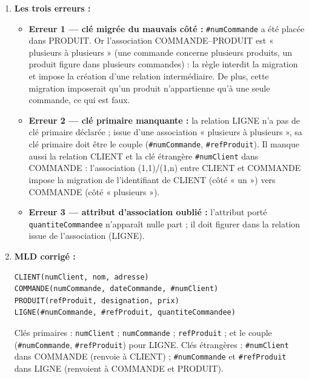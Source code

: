 \documentclass[11pt]{article}
\begin{document}
\begin{corrige}
\begin{enumerate}
  \item \textbf{Les trois erreurs :}
  \begin{itemize}
    \item \textbf{Erreur 1 — clé migrée du mauvais côté :} \texttt{\#numCommande} a été placée dans PRODUIT. Or l'association COMMANDE--PRODUIT est « plusieurs à plusieurs » (une commande concerne plusieurs produits, un produit figure dans plusieurs commandes) : la règle interdit la migration et impose la création d'une relation intermédiaire. De plus, cette migration imposerait qu'un produit n'appartienne qu'à une seule commande, ce qui est faux.
    \item \textbf{Erreur 2 — clé primaire manquante :} la relation LIGNE n'a pas de clé primaire déclarée ; issue d'une association « plusieurs à plusieurs », sa clé primaire doit être le couple (\texttt{\#numCommande}, \texttt{\#refProduit}). Il manque aussi la relation CLIENT et la clé étrangère \texttt{\#numClient} dans COMMANDE : l'association (1,1)/(1,n) entre CLIENT et COMMANDE impose la migration de l'identifiant de CLIENT (côté « un ») vers COMMANDE (côté « plusieurs »).
    \item \textbf{Erreur 3 — attribut d'association oublié :} l'attribut porté \texttt{quantiteCommandee} n'apparaît nulle part ; il doit figurer dans la relation issue de l'association (LIGNE).
  \end{itemize}
  \item \textbf{MLD corrigé :}
\begin{lstlisting}
CLIENT(numClient, nom, adresse)
COMMANDE(numCommande, dateCommande, #numClient)
PRODUIT(refProduit, designation, prix)
LIGNE(#numCommande, #refProduit, quantiteCommandee)
\end{lstlisting}
  Clés primaires : \texttt{numClient} ; \texttt{numCommande} ; \texttt{refProduit} ; et le couple (\texttt{\#numCommande}, \texttt{\#refProduit}) pour LIGNE. Clés étrangères : \texttt{\#numClient} dans COMMANDE (renvoie à CLIENT) ; \texttt{\#numCommande} et \texttt{\#refProduit} dans LIGNE (renvoient à COMMANDE et PRODUIT).
\end{enumerate}
\end{corrige}
\end{document}
